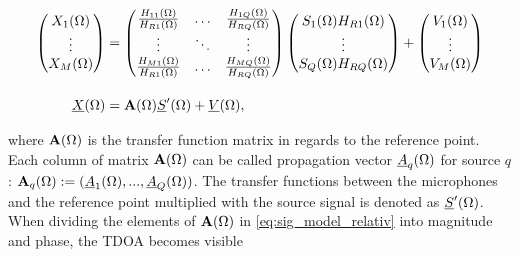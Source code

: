 
\begin{equation}
\begin{split}
  \begin{pmatrix} X_1 (\Omega) \\ \vdots \\ X_M(\Omega)\end{pmatrix}
  &=
  \begin{pmatrix}
  	\frac{{H}_{11}(\Omega)}{H_{R1}(\Omega)}  & \ldots & \frac{{H}_{1Q}(\Omega)}{H_{RQ}(\Omega)} \\
  	\vdots   & \ddots & \vdots   \\
  	\frac{{H}_{M1}(\Omega)}{H_{R1}(\Omega)}  & \ldots & \frac{{H}_{MQ}(\Omega)}{H_{RQ}(\Omega)}
  \end{pmatrix}
  \begin{pmatrix} S_1 (\Omega) H_{R1}(\Omega) \\ \vdots \\ S_Q(\Omega)H_{RQ}(\Omega)\end{pmatrix}
  + \begin{pmatrix} V_1 (\Omega) \\ \vdots \\ V_M(\Omega)\end{pmatrix} \\[1em]
  \underline{X}(\Omega) &= \mathbf{A}(\Omega)  \underline{S}'(\Omega) + \underline{V}(\Omega),
  \end{split}
  \label{eq:sig_model_relativ}
\end{equation}

where $\mathbf{A}(\Omega)$ is the transfer function matrix in regards to the reference point. Each column of matrix $\mathbf{A}(\Omega)$ can be called propagation vector $\underline{A}_q(\Omega)$ for source $q$: $\mathbf{A}_q(\Omega):=(\underline{A}_1(\Omega),...,\underline{A}_Q(\Omega))$. The transfer functions between the microphones and the reference point multiplied with the source signal is denoted as $\underline{S}'(\Omega)$. When dividing the elements of $\mathbf{A}(\Omega)$ in \ref{eq:sig_model_relativ} into magnitude and phase, the \ac{TDOA} becomes visible

